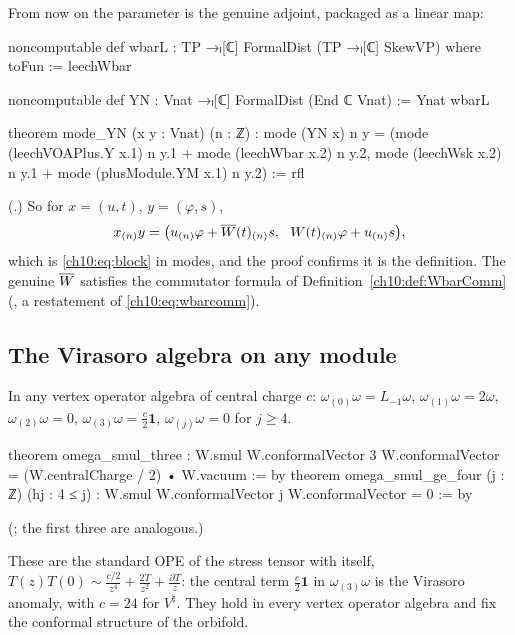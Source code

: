 From now on the parameter is the genuine adjoint, packaged as a linear map:
\begin{leancode}
noncomputable def wbarL : TP →ₗ[ℂ] FormalDist (TP →ₗ[ℂ] SkewVP) where
  toFun := leechWbar

noncomputable def YN : Vnat →ₗ[ℂ] FormalDist (End ℂ Vnat) := Ynat wbarL

theorem mode_YN (x y : Vnat) (n : ℤ) :
    mode (YN x) n y = (mode (leechVOAPlus.Y x.1) n y.1 + mode (leechWbar x.2) n y.2,
      mode (leechWsk x.2) n y.1 + mode (plusModule.YM x.1) n y.2) := rfl
\end{leancode}
(.)  So for $x=(u,t)$, $y=(\varphi,s)$,
\begin{equation}\label{ch10:eq:modeYN}
  x_{(n)}y=\bigl(u_{(n)}\varphi+\chtenWb(t)_{(n)}s,\ \ W(t)_{(n)}\varphi+u_{(n)}s\bigr),
\end{equation}
which is \eqref{ch10:eq:block} in modes, and the  proof confirms it is the definition.
The genuine $\overline{W}$ satisfies the commutator formula of Definition~\ref{ch10:def:WbarComm}
(, a restatement of \eqref{ch10:eq:wbarcomm}).

\subsection{The Virasoro algebra on any module}

\begin{proposition}\label{ch10:prop:omega}
In any vertex operator algebra of central charge $c$:
$\omega_{(0)}\omega=L_{-1}\omega$, $\omega_{(1)}\omega=2\omega$, $\omega_{(2)}\omega=0$,
$\omega_{(3)}\omega=\frac c2\mathbf1$, $\omega_{(j)}\omega=0$ for $j\ge4$.
\end{proposition}
\begin{leancode}
theorem omega_smul_three :
    W.smul W.conformalVector 3 W.conformalVector = (W.centralCharge / 2) • W.vacuum := by
theorem omega_smul_ge_four (j : ℤ) (hj : 4 ≤ j) :
    W.smul W.conformalVector j W.conformalVector = 0 := by
\end{leancode}
(; the first three are analogous.)

\begin{physics}
These are the standard OPE of the stress tensor with itself, $T(z)T(0)\sim\frac{c/2}{z^4}+\frac{2T}{z^2}+\frac{\partial T}{z}$: the central term $\tfrac c2\mathbf1$ in $\omega_{(3)}\omega$ is the Virasoro anomaly, with $c=24$ for $V^\natural$. They hold in every vertex operator algebra and fix the conformal structure of the orbifold.
\end{physics}

